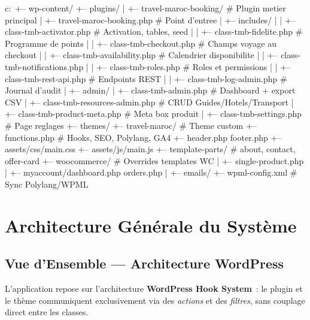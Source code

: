 \documentclass[12pt,a4paper]{report}
\begin{document}
\begin{shellbox}
c:\xampp\htdocs\boutique\
+-- wp-content/
    +-- plugins/
    |   +-- travel-maroc-booking/           # Plugin metier principal
    |       +-- travel-maroc-booking.php    # Point d'entree
    |       +-- includes/
    |       |   +-- class-tmb-activator.php    # Activation, tables, seed
    |       |   +-- class-tmb-fidelite.php     # Programme de points
    |       |   +-- class-tmb-checkout.php     # Champs voyage au checkout
    |       |   +-- class-tmb-availability.php # Calendrier disponibilite
    |       |   +-- class-tmb-notifications.php
    |       |   +-- class-tmb-roles.php        # Roles et permissions
    |       |   +-- class-tmb-rest-api.php     # Endpoints REST
    |       |   +-- class-tmb-log-admin.php    # Journal d'audit
    |       +-- admin/
    |           +-- class-tmb-admin.php        # Dashboard + export CSV
    |           +-- class-tmb-resources-admin.php # CRUD Guides/Hotels/Transport
    |           +-- class-tmb-product-meta.php # Meta box produit
    |           +-- class-tmb-settings.php     # Page reglages
    +-- themes/
        +-- travel-maroc/                   # Theme custom
            +-- functions.php               # Hooks, SEO, Polylang, GA4
            +-- header.php  footer.php
            +-- assets/css/main.css
            +-- assets/js/main.js
            +-- template-parts/             # about, contact, offer-card
            +-- woocommerce/                # Overrides templates WC
            |   +-- single-product.php
            |   +-- myaccount/dashboard.php orders.php
            |   +-- emails/
            +-- wpml-config.xml             # Sync Polylang/WPML
\end{shellbox}

\chapter{Architecture G\'en\'erale du Syst\`eme}

\section{Vue d'Ensemble --- Architecture WordPress}

L'application repose sur l'architecture \textbf{WordPress Hook System}~: le plugin
et le th\`eme communiquent exclusivement via des \textit{actions} et des
\textit{filtres}, sans couplage direct entre les classes.
\end{document}
